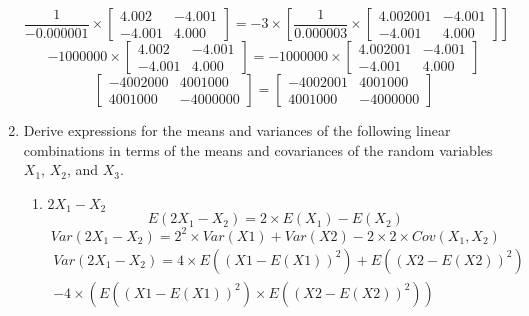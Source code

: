 \documentclass[12pt,a4paper]{paper}
\begin{document}
\begin{enumerate}
\begin{equation}
\frac{1}{-0.000001}\times\left[ \begin{array}{cc}4.002 & -4.001 \\-4.001 & 4.000\end{array} \right] = -3\times\left[\frac{1}{0.000003}\times\left[ \begin{array}{cc}4.002001 & -4.001 \\-4.001 & 4.000 \end{array} \right]\right]
\end{equation}
\begin{equation}
-1000000 \times \left[ \begin{array}{cc}4.002 & -4.001 \\-4.001 & 4.000\end{array} \right] = -1000000 \times \left[ \begin{array}{cc}4.002001 & -4.001 \\-4.001 & 4.000 \end{array} \right]
\end{equation}
\begin{equation}
\left[ \begin{array}{cc}-4002000 & 4001000 \\4001000 & -4000000\end{array} \right] = \left[ \begin{array}{cc}-4002001 & 4001000 \\4001000 & -4000000 \end{array} \right]
\end{equation}
\item Derive expressions for the means and variances of the following linear combinations in terms of the means and covariances of the random variables $X_{1}$, $X_{2}$, and $X_{3}$.
\begin{enumerate}
\item $2X_{1} - X_{2}$
\begin{equation}
E(2X_{1} - X_{2}) = 2\times E(X_{1}) - E(X_{2})
\end{equation}
\begin{equation}
Var(2X_{1} - X_{2}) = 2^2 \times Var(X1) + Var(X2) - 2 \times 2 \times Cov(X_{1},X_{2})
\end{equation}
\begin{equation}
\begin{split}
Var(2X_{1} - X_{2}) = 4 \times E((X1-E(X1))^2) + E((X2-E(X2))^2) \\- 4 \times (E((X1-E(X1))^2) \times E((X2-E(X2))^2))

\end{split}
\end{equation}
\end{enumerate}
\end{enumerate}
\end{document}
